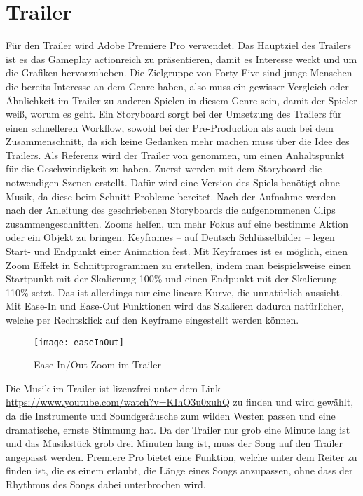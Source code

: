 \section{Trailer}\label{sec:trailer}

\renewcommand{\kapitelautor}{Autor: Markus Böheim}

Für den Trailer wird Adobe Premiere Pro verwendet.
Das Hauptziel des Trailers
ist es das Gameplay actionreich zu präsentieren, damit es Interesse weckt und um die Grafiken hervorzuheben.
Die Zielgruppe von Forty-Five sind junge Menschen die bereits Interesse an dem Genre haben, also muss ein gewisser
Vergleich oder Ähnlichkeit im Trailer zu anderen Spielen in diesem Genre sein, damit der Spieler weiß, worum es geht.
Ein Storyboard sorgt bei der Umsetzung des Trailers für einen
schnelleren Workflow, sowohl bei der Pre-Production als auch bei dem Zusammenschnitt, da sich keine Gedanken mehr machen muss über die Idee des Trailers.
Als Referenz wird der Trailer von  genommen, um einen Anhaltspunkt für die Geschwindigkeit zu haben.
Zuerst werden mit dem Storyboard die notwendigen Szenen erstellt.
Dafür wird eine Version des Spiels benötigt ohne Musik, da diese beim Schnitt Probleme bereitet.
Nach der Aufnahme werden nach der Anleitung des geschriebenen Storyboards die aufgenommenen Clips zusammengeschnitten.
Zooms helfen, um mehr Fokus auf eine bestimme Aktion oder ein Objekt zu bringen.
Keyframes – auf Deutsch Schlüsselbilder – legen Start- und Endpunkt einer Animation fest.
Mit Keyframes ist es möglich, einen Zoom Effekt in Schnittprogrammen zu erstellen, indem man beispielsweise einen Startpunkt mit der Skalierung 100\% und einen Endpunkt mit der Skalierung 110\% setzt.
Das ist allerdings nur eine lineare Kurve, die unnatürlich aussieht.
Mit Ease-In und Ease-Out Funktionen wird das Skalieren dadurch natürlicher, welche per Rechtsklick auf den Keyframe eingestellt werden können.

\begin{figure}[H]
\centering
\texttt{[image: easeInOut]}
\caption{Ease-In/Out Zoom im Trailer}
\end{figure}

Die Musik im Trailer ist lizenzfrei unter dem Link \url{https://www.youtube.com/watch?v=KIhO3u0xuhQ} zu finden und wird gewählt, da die Instrumente und Soundgeräusche zum wilden Westen passen und eine dramatische, ernste Stimmung hat. Da der Trailer nur grob eine Minute lang ist und das Musikstück grob drei Minuten lang ist, muss der Song auf den Trailer angepasst werden.
Premiere Pro bietet eine  Funktion, welche unter dem 
Reiter zu finden ist, die es einem erlaubt, die Länge eines Songs anzupassen, ohne dass der Rhythmus des Songs dabei unterbrochen wird.

